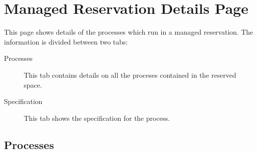 % 
% 
% 
% 
\section{Managed Reservation Details Page}
\label{sec:ws-managed-reservation-details}

This page shows details of the processes which run in a managed reservation.  The
information is divided between two tabs:

   \begin{description}
       \item[Processes] This tab contains details on all the proceses contained in the
         reserved space.
       \item[Specification] This tab shows the specification for the process.
   \end{description}  

   \subsection{Processes}
   \label{sec:ws-manres-processes}

